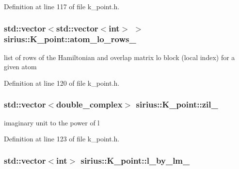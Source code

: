 Definition at line 117 of file k\+\_\+point.\+h.

\hypertarget{classsirius_1_1_k__point_adf2c9c65bb23f1ce9a7451d5d4553195}{}
\subsubsection[{atom\+\_\+lo\+\_\+rows\+\_\+}]{\setlength{\rightskip}{0pt plus 5cm}std\+::vector$<$std\+::vector$<$int$>$ $>$ sirius\+::\+K\+\_\+point\+::atom\+\_\+lo\+\_\+rows\+\_\+\hspace{0.3cm}{\ttfamily [private]}}\label{classsirius_1_1_k__point_adf2c9c65bb23f1ce9a7451d5d4553195}


list of rows of the Hamiltonian and overlap matrix lo block (local index) for a given atom 



Definition at line 120 of file k\+\_\+point.\+h.

\hypertarget{classsirius_1_1_k__point_a63bb5c2fb436b8292cfc9215f488b44a}{}
\subsubsection[{zil\+\_\+}]{\setlength{\rightskip}{0pt plus 5cm}std\+::vector$<$double\+\_\+complex$>$ sirius\+::\+K\+\_\+point\+::zil\+\_\+\hspace{0.3cm}{\ttfamily [private]}}\label{classsirius_1_1_k__point_a63bb5c2fb436b8292cfc9215f488b44a}


imaginary unit to the power of l 



Definition at line 123 of file k\+\_\+point.\+h.

\hypertarget{classsirius_1_1_k__point_afcd70ca076b5714dfbc9ceb8503299b6}{}
\subsubsection[{l\+\_\+by\+\_\+lm\+\_\+}]{\setlength{\rightskip}{0pt plus 5cm}std\+::vector$<$int$>$ sirius\+::\+K\+\_\+point\+::l\+\_\+by\+\_\+lm\+\_\+\hspace{0.3cm}{\ttfamily [private]}}\label{classsirius_1_1_k__point_afcd70ca076b5714dfbc9ceb8503299b6}


